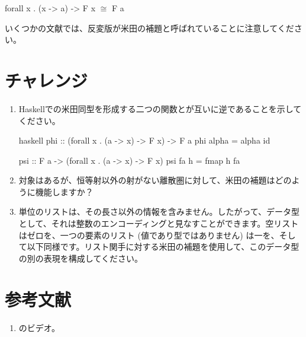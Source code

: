 \begin{snipv}
forall x . (x -> a) -> F x \ensuremath{\cong} F a
\end{snipv}
いくつかの文献では、反変版が米田の補題と呼ばれていることに注意してください。

\section{チャレンジ}

\begin{enumerate}
  \tightlist
  \item
        Haskellでの米田同型を形成する二つの関数とが互いに逆であることを示してください。

        \begin{snip}{haskell}
phi :: (forall x . (a -> x) -> F x) -> F a
phi alpha = alpha id

psi :: F a -> (forall x . (a -> x) -> F x)
psi fa h = fmap h fa
\end{snip}
  \item
        対象はあるが、恒等射以外の射がない離散圏に対して、米田の補題はどのように機能しますか？
  \item
        単位のリスト\code{{[}(){]}}は、その長さ以外の情報を含みません。したがって、データ型として、それは整数のエンコーディングと見なすことができます。空リストはゼロを、一つの要素のリスト\code{{[}(){]}} (値であり型ではありません) は一を、そして以下同様です。リスト関手に対する米田の補題を使用して、このデータ型の別の表現を構成してください。
\end{enumerate}

\section{参考文献}

\begin{enumerate}
  \tightlist
  \item
        のビデオ。
\end{enumerate}

